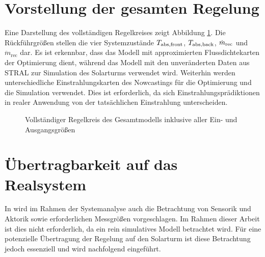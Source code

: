 \section{Vorstellung der gesamten Regelung} \label{sec_VorstelungRegelung}
Eine Darstellung des vollständigen Regelkreises zeigt Abbildung \ref{fig_Regelkreisvollst}.
Die Rückführgrößen stellen die vier Systemzustände $T_{\mathrm{abs,front}}$, $T_{\mathrm{abs,back}}$, $\dot{m}_{\mathrm{rec}}$ und $\ddot{m}_{\mathrm{rec}}$ dar.
Es ist erkennbar, dass das Modell mit approximierten Flussdichtekarten der Optimierung dient, während das Modell mit den unveränderten Daten aus STRAL zur Simulation des Solarturms verwendet wird.
Weiterhin werden unterschiedliche Einstrahlungskarten des Nowcastings für die Optimierung und die Simulation verwendet.
Dies ist erforderlich, da sich Einstrahlungsprädiktionen in realer Anwendung von der tatsächlichen Einstrahlung unterscheiden.

\begin{figure}[h!]
   \centering
   \setlength{\fboxsep}{1pt}
   \setlength{\fboxrule}{1pt}
   \caption[Vollständiger Regelkreis des Gesamtmodells inklusive aller Ein- und Ausgangsgrößen]{Vollständiger Regelkreis des Gesamtmodells inklusive aller Ein- und Ausgangsgrößen}
   \label{fig_Regelkreisvollst}
\end{figure}


\section{Übertragbarkeit auf das Realsystem} \label{sec_RealsystemRegelung}
In \cite[S.1]{Skogestad} wird im Rahmen der Systemanalyse auch die Betrachtung von Sensorik und Aktorik sowie erforderlichen Messgrößen vorgeschlagen.
Im Rahmen dieser Arbeit ist dies nicht erforderlich, da ein rein simulatives Modell betrachtet wird.
Für eine potenzielle Übertragung der Regelung auf den Solarturm ist diese Betrachtung jedoch essenziell und wird nachfolgend eingeführt.

